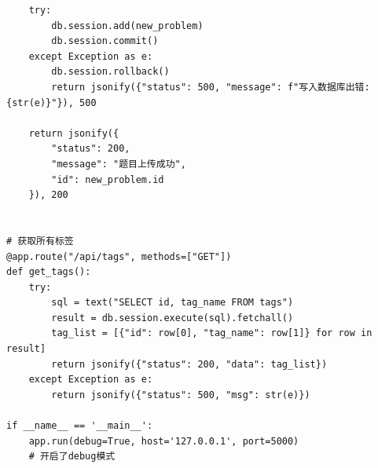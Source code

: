 \documentclass[a4paper,AutoFakeBold={2.7}]{ctexart} %
\begin{document}
\begin{lstlisting}
    try:
        db.session.add(new_problem)
        db.session.commit()
    except Exception as e:
        db.session.rollback()
        return jsonify({"status": 500, "message": f"写入数据库出错: {str(e)}"}), 500

    return jsonify({
        "status": 200,
        "message": "题目上传成功",
        "id": new_problem.id
    }), 200


# 获取所有标签
@app.route("/api/tags", methods=["GET"])
def get_tags():
    try:
        sql = text("SELECT id, tag_name FROM tags")
        result = db.session.execute(sql).fetchall()
        tag_list = [{"id": row[0], "tag_name": row[1]} for row in result]
        return jsonify({"status": 200, "data": tag_list})
    except Exception as e:
        return jsonify({"status": 500, "msg": str(e)})

if __name__ == '__main__':
    app.run(debug=True, host='127.0.0.1', port=5000)
    # 开启了debug模式
\end{lstlisting}
\end{document}
